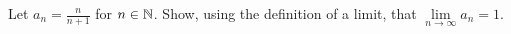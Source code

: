 \begin{problem}
  Let $a_n = \frac{n}{n + 1}$ for $n \in \mathbb{N}$.
  Show, using the definition of a limit, that $\lim\limits_{n \to \infty}{a_n} = 1$.
\end{problem}
\begin{answer}
  
\end{answer}
